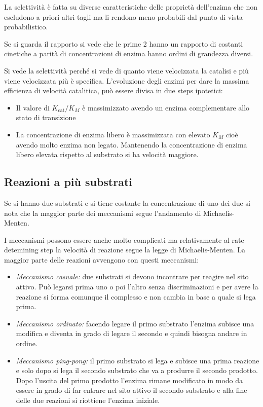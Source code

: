 La selettività è fatta su diverse caratteristiche
delle proprietà dell’enzima che non escludono a priori altri tagli ma li rendono meno
probabili dal punto di vista probabilistico.

Se si guarda il rapporto si vede che le prime 2 hanno un rapporto di costanti cinetiche
a parità di concentrazioni di enzima hanno ordini di grandezza diversi.

Si vede la selettività perché si vede di quanto viene velocizzata la catalisi e più viene
velocizzata più è specifica.
L’evoluzione degli enzimi per dare la massima efficienza di velocità catalitica, può essere divisa in due steps ipotetici:
\begin{itemize}
\item Il valore di $K_{\text{cat}}/K_M$ è massimizzato avendo un enzima complementare allo
stato di transizione
\item La concentrazione di enzima libero \ce{[E]} è massimizzata con elevato $K_M$ cioè
avendo molto enzima non legato. Mantenendo la concentrazione di enzima libero elevata rispetto al substrato si ha velocità maggiore.
\end{itemize}

\clearpage

\subsection{Reazioni a più substrati}

Se si hanno due substrati e si tiene costante la concentrazione di uno dei due si nota
che la maggior parte dei meccanismi segue l’andamento di Michaelis-Menten.

I meccanismi possono essere anche molto complicati ma relativamente al rate detemining step la velocità di reazione segue la legge di Michaelis-Menten.
La maggior parte delle reazioni avvengono con questi meccanismi:
\begin{itemize}
\item \emph{Meccanismo casuale:} due substrati si devono incontrare per reagire nel sito attivo.
Può legarsi
prima uno o poi l’altro senza discriminazioni e per avere la reazione si forma comunque il complesso e non cambia in base a quale si lega prima.
\item \emph{Meccanismo ordinato:} facendo legare il primo substrato l’enzima subisce una modifica e diventa
in grado di legare il secondo e quindi bisogna andare in ordine.
\item \emph{Meccanismo ping-pong:} il primo substrato si lega e subisce una prima reazione e solo dopo si lega
il secondo substrato che va a produrre il secondo prodotto. Dopo l’uscita del primo prodotto l’enzima rimane modificato in modo da
essere in grado di far entrare nel sito attivo il secondo substrato e alla fine
delle due reazioni si riottiene l’enzima iniziale.
\end{itemize}

